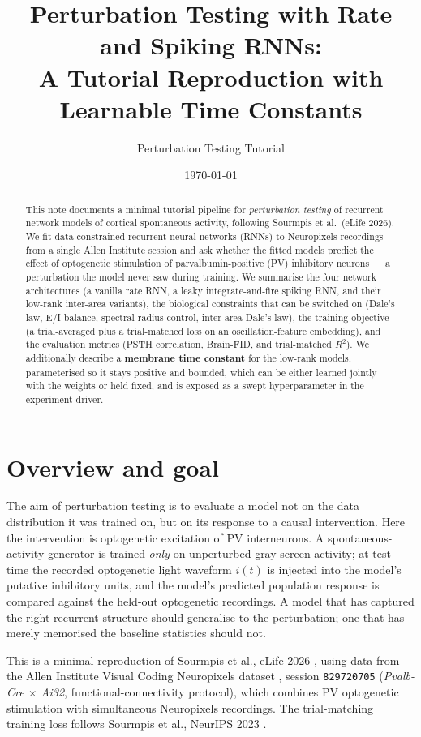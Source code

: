 \documentclass[11pt]{article}
\title{Perturbation Testing with Rate and Spiking RNNs:\\
A Tutorial Reproduction with Learnable Time Constants}
\author{Perturbation Testing Tutorial}
\date{\today}
\newcommand{\code}[1]{\texttt{#1}}
\begin{document}
\maketitle

\begin{abstract}
This note documents a minimal tutorial pipeline for \emph{perturbation testing}
of recurrent network models of cortical spontaneous activity, following
Sourmpis et al.\ (eLife 2026). We fit data-constrained recurrent neural networks
(RNNs) to Neuropixels recordings from a single Allen Institute session and ask
whether the fitted models predict the effect of optogenetic stimulation of
parvalbumin-positive (PV) inhibitory neurons --- a perturbation the model never
saw during training. We summarise the four network architectures (a vanilla rate
RNN, a leaky integrate-and-fire spiking RNN, and their low-rank inter-area
variants), the biological constraints that can be switched on (Dale's law,
E/I balance, spectral-radius control, inter-area Dale's law), the training
objective (a trial-averaged plus a trial-matched loss on an oscillation-feature
embedding), and the evaluation metrics (PSTH correlation, Brain-FID, and
trial-matched $R^2$). We additionally describe a \textbf{membrane time
constant} for the low-rank models, parameterised so it stays positive and bounded,
which can be either learned jointly with the weights or held fixed, and is exposed
as a swept hyperparameter in the experiment driver.
\end{abstract}

\section{Overview and goal}
The aim of perturbation testing is to evaluate a model not on the data
distribution it was trained on, but on its response to a causal intervention.
Here the intervention is optogenetic excitation of PV interneurons. A
spontaneous-activity generator is trained \emph{only} on unperturbed
gray-screen activity; at test time the recorded optogenetic light waveform
$i(t)$ is injected into the model's putative inhibitory units, and the model's
predicted population response is compared against the held-out optogenetic
recordings. A model that has captured the right recurrent structure should
generalise to the perturbation; one that has merely memorised the baseline
statistics should not.

This is a minimal reproduction of Sourmpis et al., eLife 2026
\cite{sourmpis2026}, using data from the Allen Institute Visual Coding
Neuropixels dataset \cite{siegle2021}, session \code{829720705}
(\emph{Pvalb-Cre $\times$ Ai32}, functional-connectivity protocol), which
combines PV optogenetic stimulation with simultaneous Neuropixels recordings.
The trial-matching training loss follows Sourmpis et al., NeurIPS 2023
\cite{sourmpis2023}.
\end{document}
